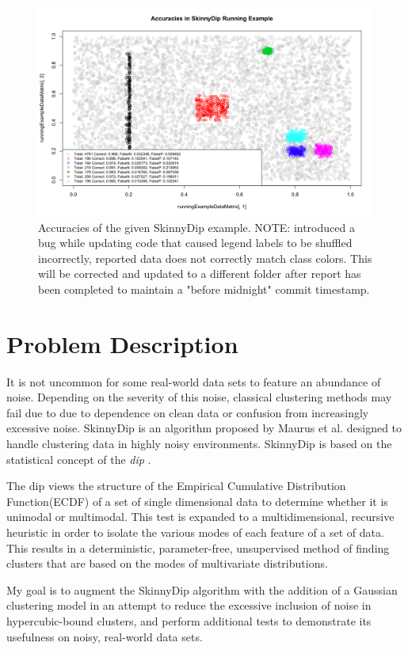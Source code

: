 \documentclass{sig-alternate-05-2015}
\begin{document}
\begin{figure}[t]
\centering
\includegraphics[width=\textwidth]{images/SkinnyDipAccuracy}
\caption{Accuracies of the given SkinnyDip example. NOTE: introduced a bug while updating code that caused legend labels to be shuffled incorrectly, reported data does not correctly match class colors. This will be corrected and updated to a different folder after report has been completed to maintain a "before midnight" commit timestamp.}
\label{fig:sdaccuracy}
\end{figure}

\section{Problem Description}
It is not uncommon for some real-world data sets to feature an abundance of noise. Depending on the severity of this noise, classical clustering methods may fail due to due to dependence on clean data or confusion from increasingly excessive noise. SkinnyDip is an algorithm proposed by Maurus et al.\cite{skinnydip} designed to handle clustering data in highly noisy environments. SkinnyDip is based on the statistical concept of the \textit{dip} \cite{dip}. 

The dip views the structure of the Empirical Cumulative Distribution Function(ECDF) of a set of single dimensional data to determine whether it is unimodal or multimodal. This test is expanded to a multidimensional, recursive heuristic in order to isolate the various modes of each feature of a set of data. This results in a deterministic, parameter-free, unsupervised method of finding clusters that are based on the modes of multivariate distributions. 

My goal is to augment the SkinnyDip algorithm with the addition of a Gaussian clustering model in an attempt to reduce the excessive inclusion of noise in hypercubic-bound clusters, and perform additional tests to demonstrate its usefulness on noisy, real-world data sets.
\end{document}
